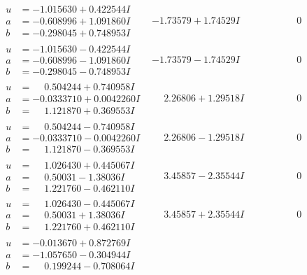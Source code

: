 \documentclass[1p]{elsarticle_modified}
\theoremstyle{definition}
\begin{document}
$$\begin{array}{c|c|c}
\begin{aligned}
u &= -1.015630 + 0.422544 I \\
a &= -0.608996 + 1.091860 I \\
b &= -0.298045 + 0.748953 I\end{aligned}
 & -1.73579 + 1.74529 I & \phantom{-0.000000 } 0 \\ \hline\begin{aligned}
u &= -1.015630 - 0.422544 I \\
a &= -0.608996 - 1.091860 I \\
b &= -0.298045 - 0.748953 I\end{aligned}
 & -1.73579 - 1.74529 I & \phantom{-0.000000 } 0 \\ \hline\begin{aligned}
u &= \phantom{-}0.504244 + 0.740958 I \\
a &= -0.0333710 + 0.0042260 I \\
b &= \phantom{-}1.121870 + 0.369553 I\end{aligned}
 & \phantom{-}2.26806 + 1.29518 I & \phantom{-0.000000 } 0 \\ \hline\begin{aligned}
u &= \phantom{-}0.504244 - 0.740958 I \\
a &= -0.0333710 - 0.0042260 I \\
b &= \phantom{-}1.121870 - 0.369553 I\end{aligned}
 & \phantom{-}2.26806 - 1.29518 I & \phantom{-0.000000 } 0 \\ \hline\begin{aligned}
u &= \phantom{-}1.026430 + 0.445067 I \\
a &= \phantom{-}0.50031 - 1.38036 I \\
b &= \phantom{-}1.221760 - 0.462110 I\end{aligned}
 & \phantom{-}3.45857 - 2.35544 I & \phantom{-0.000000 } 0 \\ \hline\begin{aligned}
u &= \phantom{-}1.026430 - 0.445067 I \\
a &= \phantom{-}0.50031 + 1.38036 I \\
b &= \phantom{-}1.221760 + 0.462110 I\end{aligned}
 & \phantom{-}3.45857 + 2.35544 I & \phantom{-0.000000 } 0 \\ \hline\begin{aligned}
u &= -0.013670 + 0.872769 I \\
a &= -1.057650 - 0.304944 I \\
b &= \phantom{-}0.199244 - 0.708064 I\end{aligned}

\end{array}$$
\end{document}
